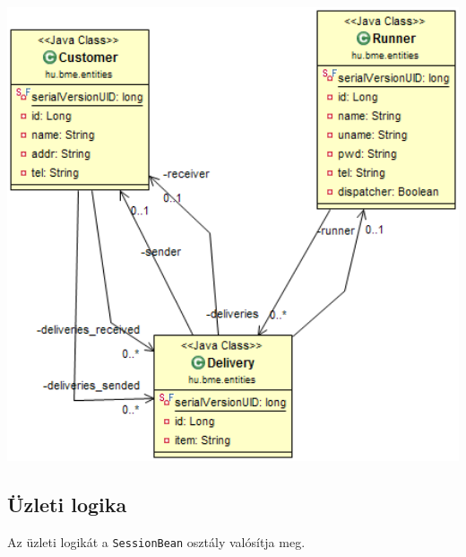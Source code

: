 \documentclass[a4paper,oneside,12pt]{article}
\begin{document}
\begin{center}
        \includegraphics[width=14cm]{entities.PNG}
        \label{fig:entities}
\end{center}

\subsection{Üzleti logika}
Az üzleti logikát a \verb+SessionBean+ osztály valósítja meg.
\end{document}
